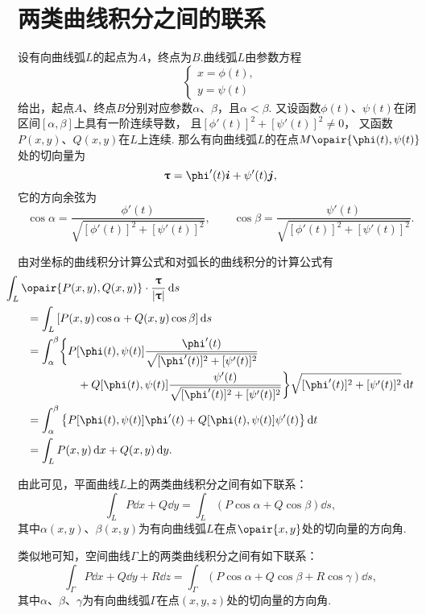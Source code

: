 \section{两类曲线积分之间的联系}
\begingroup
\def\lenTau{\sqrt{[\phi'(t)]^2+[\psi'(t)]^2}}
\def\fTau#1{\frac{#1}{\lenTau}}
\def\funcParam{[\phi(t),\psi(t)]}

设有向曲线弧\(L\)的起点为\(A\)，终点为\(B\).曲线弧\(L\)由参数方程\[
\begin{cases}
x = \phi(t), \\
y = \psi(t)
\end{cases}
\]给出，起点\(A\)、终点\(B\)分别对应参数\(\alpha\)、\(\beta\)，且\(\alpha < \beta\).
又设函数\(\phi(t)\)、\(\psi(t)\)在闭区间\([\alpha,\beta]\)上具有一阶连续导数，
且\([\phi'(t)]^2+[\psi'(t)]^2 \neq 0\)，
又函数\(P(x,y)\)、\(Q(x,y)\)在\(L\)上连续.
那么有向曲线弧\(L\)的在点\(M\opair{\phi(t),\psi(t)}\)处的切向量为\[
\vb{\tau} = \phi'(t) \vb{i} + \psi'(t) \vb{j},
\]它的方向余弦为\[
\cos\alpha=\fTau{\phi'(t)},
\qquad
\cos\beta=\fTau{\psi'(t)}.
\]

由对坐标的曲线积分计算公式和对弧长的曲线积分的计算公式有
\begin{align*}
&\hspace{-20pt}\int_L{\opair{P(x,y),Q(x,y)}\cdot\frac{\vb{\tau}}{\abs{\vb{\tau}}}\dd{s}} \\
&=\int_L{[P(x,y)\cos\alpha+Q(x,y)\cos\beta]\dd{s}} \\
&=\int_{\alpha}^{\beta} \biggl\{ {P\funcParam\fTau{\phi'(t)}} \\
	&\hspace{45pt}+{Q\funcParam\fTau{\psi'(t)}} \biggr\} \lenTau \dd{t} \\
&=\int_{\alpha}^{\beta} \left\{
		P\funcParam\phi'(t) + Q\funcParam\psi'(t)
	\right\} \dd{t} \\
&=\int_L{P(x,y)\dd{x}+Q(x,y)\dd{y}}.
\end{align*}
\endgroup

由此可见，平面曲线\(L\)上的两类曲线积分之间有如下联系：
\begin{equation}\label{equation:线积分与面积分.平面曲线上两类曲线积分之间的联系}
\int_L{P\dd{x}+Q\dd{y}}
=\int_L{(P\cos\alpha+Q\cos\beta)\dd{s}},
\end{equation}
其中\(\alpha(x,y)\)、\(\beta(x,y)\)为有向曲线弧\(L\)在点\(\opair{x,y}\)处的切向量的方向角.

类似地可知，空间曲线\(\Gamma\)上的两类曲线积分之间有如下联系：
\begin{equation}\label{equation:线积分与面积分.空间曲线上两类曲线积分之间的联系}
\int_\Gamma{P\dd{x}+Q\dd{y}+R\dd{z}}
=\int_\Gamma{(P\cos\alpha+Q\cos\beta+R\cos\gamma)\dd{s}},
\end{equation}其中\(\alpha\)、\(\beta\)、\(\gamma\)为有向曲线弧\(\Gamma\)在点\((x,y,z)\)处的切向量的方向角.

